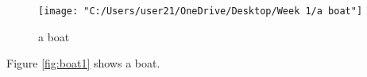 \documentclass{article}
\begin{document}
	\begin{figure}
	\texttt{[image: "C:/Users/user21/OneDrive/Desktop/Week 1/a boat"]}
		\caption{a boat}
		\label{fig:a-boat}
	\end{figure}
	Figure \ref{fig:boat1} shows a boat.
\end{document}
